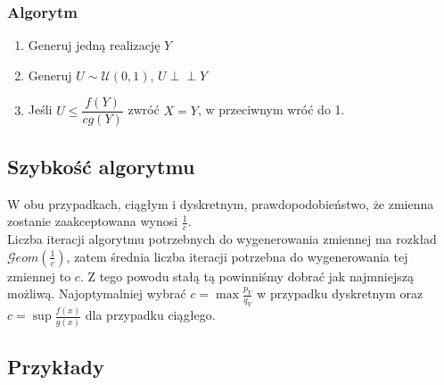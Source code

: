 \documentclass[12pt]{mwrep}
\newcommand{\indep}{\perp \!\!\! \perp}
\begin{document}
	\subsubsection{Algorytm}
	\begin{enumerate}[leftmargin=10mm]
		\item Generuj jedną realizację $Y$
		\item Generuj $U\sim \mathcal{U}(0,1)$, $U\indep Y$
		\item Jeśli $U\leqslant\dfrac{f(Y)}{cg(Y)}$ zwróć $X=Y$, w przeciwnym wróć do 1.
	\end{enumerate}

	\subsection{Szybkość algorytmu}
	W obu przypadkach, ciągłym i dyskretnym, prawdopodobieństwo, że zmienna zostanie zaakceptowana wynosi $\frac{1}{c}$.\\
	Liczba iteracji algorytmu potrzebnych do wygenerowania zmiennej ma rozkład $\mathcal{G}eom(\frac{1}{c})$, zatem średnia liczba iteracji potrzebna do wygenerowania tej zmiennej to $c$. Z tego powodu stałą tą powinniśmy dobrać jak najmniejszą możliwą. Najoptymalniej wybrać $c=\max\frac{p_Y}{q_Y}$ w przypadku dyskretnym oraz $c=\sup\frac{f(x)}{g(x)}$ dla przypadku ciągłego.

	\subsection{Przykłady}
	
\end{document}
